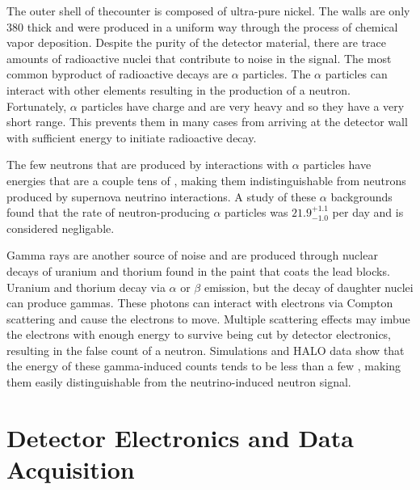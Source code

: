 	The outer shell of the\he counter is composed of ultra-pure nickel. The walls are only \SI{380}{\micron} thick and were produced in a uniform way through the process of chemical vapor deposition. Despite the purity of the detector material, there are trace amounts of radioactive nuclei that contribute to noise in the signal. The most common byproduct of radioactive decays are $\alpha$ particles. The $\alpha$ particles can interact with other elements resulting in the production of a neutron. Fortunately, $\alpha$ particles have charge and are very heavy and so they have a very short range. This prevents them in many cases from arriving at the detector wall with sufficient energy to initiate radioactive decay. 

	The few neutrons that are produced by interactions with $\alpha$ particles have energies that are a couple tens of \eMeV{}, making them indistinguishable from neutrons produced by supernova neutrino interactions. A study of these $\alpha$ backgrounds found that the rate of neutron-producing $\alpha$ particles was $21.9^{+1.1}_{-1.0}$ per day and is considered negligable\cite{Shantz2010}. 

	Gamma rays are another source of noise and are produced through nuclear decays of uranium and thorium found in the paint that coats the lead blocks. Uranium and thorium decay via $\alpha$ or $\beta$ emission, but the decay of daughter nuclei can produce gammas. These photons can interact with electrons via Compton scattering and cause the electrons to move. Multiple scattering effects may imbue the electrons with enough energy to survive being cut by detector electronics, resulting in the false count of a neutron. Simulations\cite{Shantz2010} and HALO data show that the energy of these gamma-induced counts tends to be less than a few \eMeV{}, making them easily distinguishable from the neutrino-induced neutron signal.

	\section{Detector Electronics and Data Acquisition}
	\label{sec:electronics}
		\filler


